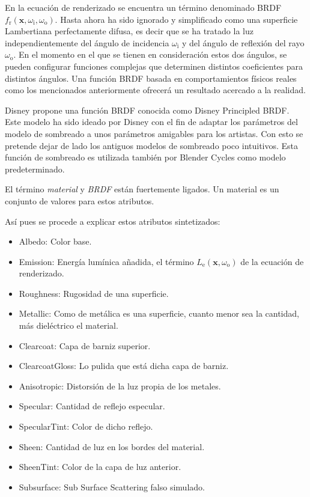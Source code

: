 En la ecuación de renderizado se encuentra un término denominado BRDF $f_{\text{r}}(\mathbf {x} ,\omega _{\text{i}},\omega _{\text{o}})$. Hasta ahora ha sido ignorado y simplificado como una superficie Lambertiana perfectamente difusa, es decir que se ha tratado la luz independientemente del ángulo de incidencia $\omega _{\text{i}}$ y del ángulo de reflexión del rayo $\omega _{\text{o}}$. En el momento en el que se tienen en consideración estos dos ángulos, se pueden configurar funciones complejas que determinen distintos coeficientes para distintos ángulos. Una función BRDF basada en comportamientos físicos reales como los mencionados anteriormente ofrecerá un resultado acercado a la realidad. 
	
Disney propone una función BRDF conocida como Disney Principled BRDF\cite{burley2012physically}. Este modelo ha sido ideado por Disney con el fin de adaptar los parámetros del modelo de sombreado a unos parámetros amigables para los artistas. Con esto se pretende dejar de lado los antiguos modelos de sombreado poco intuitivos. Esta función de sombreado es utilizada también por Blender Cycles como modelo predeterminado.
	
El término \emph{material} y \emph{BRDF} están fuertemente ligados. Un material es un conjunto de valores para estos atributos.
		
Así pues se procede a explicar estos atributos sintetizados:

\begin{itemize}

	\item Albedo: Color base.
	\item Emission: Energía lumínica añadida, el término $L_{\text{e}}(\mathbf {x} ,\omega _{\text{o}})$ de la ecuación de renderizado.
	\item Roughness: Rugosidad de una superficie.
	\item Metallic: Como de metálica es una superficie, cuanto menor sea la cantidad, más dieléctrico el material.
	\item Clearcoat: Capa de barniz superior.
	\item ClearcoatGloss: Lo pulida que está dicha capa de barniz.
	\item Anisotropic: Distorsión de la luz propia de los metales.
	\item Specular: Cantidad de reflejo especular.
	\item SpecularTint: Color de dicho reflejo.
	\item Sheen: Cantidad de luz en los bordes del material.
	\item SheenTint: Color de la capa de luz anterior.
	\item Subsurface: Sub Surface Scattering falso simulado.
	
\end{itemize}

